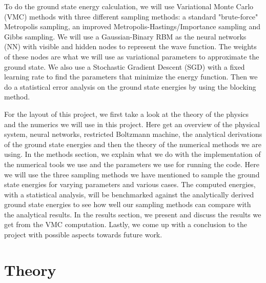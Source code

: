 \documentclass[12pt,a4paper,english]{article}
\begin{document}
To do the ground state energy calculation, we will use Variational Monte Carlo (VMC) methods with three different sampling methods: a standard "brute-force" Metropolis sampling, an improved Metropolis-Hastings/Importance sampling and Gibbs sampling. We will use a Gaussian-Binary RBM as the neural networks (NN) with visible and hidden nodes to represent the wave function. The weights of these nodes are what we will use as variational parameters to approximate the ground state. We also use a Stochastic Gradient Descent (SGD) with a fixed learning rate to find the parameters that minimize the energy function. Then we do a statistical error analysis on the ground state energies by using the blocking method.

For the layout of this project, we first take a look at the theory of the physics and the numerics we will use in this project. Here get an overview of the physical system, neural networks, restricted Boltzmann machine, the analytical derivations of the ground state energies and then the theory of the numerical methods we are using. In the methods section, we explain what we do with the implementation of the numerical tools we use and the parameters we use for running the code. Here we will use the three sampling methods we have mentioned to sample the ground state energies for varying parameters and various cases. The computed energies, with a statistical analysis, will be benchmarked against the analytically derived ground state energies to see how well our sampling methods can compare with the analytical results. In the results section, we present and discuss the results we get from the VMC computation. Lastly, we come up with a conclusion to the project with possible aspects towards future work.


\section{Theory}
\label{sect:Theory}
\end{document}
